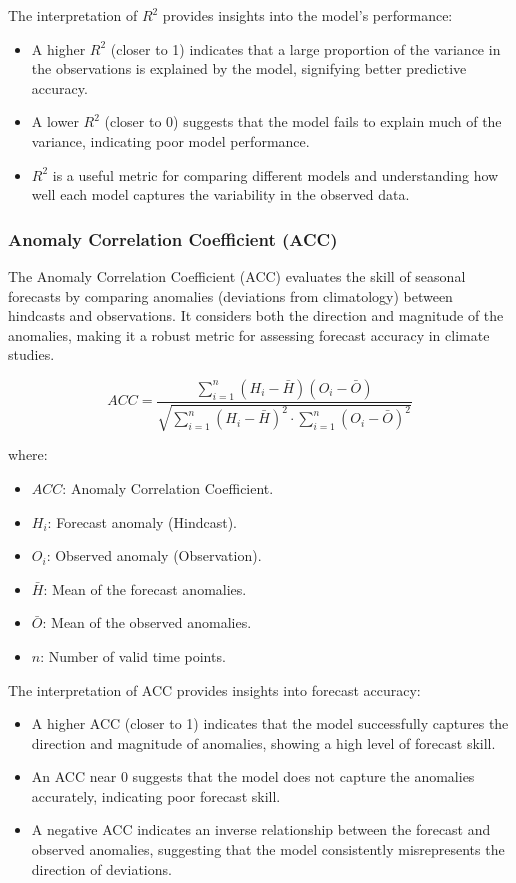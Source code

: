 The interpretation of \( R^2 \) provides insights into the model's performance:  
\begin{itemize}
    \item A higher \( R^2 \) (closer to 1) indicates that a large proportion of the variance in the observations is explained by the model, signifying better predictive accuracy.  
    \item A lower \( R^2 \) (closer to 0) suggests that the model fails to explain much of the variance, indicating poor model performance.  
    \item \( R^2 \) is a useful metric for comparing different models and understanding how well each model captures the variability in the observed data.  
\end{itemize}

\subsubsection{Anomaly Correlation Coefficient (ACC)}

The Anomaly Correlation Coefficient (ACC) evaluates the skill of seasonal forecasts by comparing anomalies (deviations from climatology) between hindcasts and observations. It considers both the direction and magnitude of the anomalies, making it a robust metric for assessing forecast accuracy in climate studies.

\[
ACC = \frac{\sum_{i=1}^{n} (H_i - \bar{H})(O_i - \bar{O})}{\sqrt{\sum_{i=1}^{n} (H_i - \bar{H})^2 \cdot \sum_{i=1}^{n} (O_i - \bar{O})^2}}
\]

where:  
\begin{itemize}
    \item \( ACC \): Anomaly Correlation Coefficient.  
    \item \( H_i \): Forecast anomaly (Hindcast).  
    \item \( O_i \): Observed anomaly (Observation).  
    \item \( \bar{H} \): Mean of the forecast anomalies.  
    \item \( \bar{O} \): Mean of the observed anomalies.  
    \item \( n \): Number of valid time points.  
\end{itemize}

The interpretation of ACC provides insights into forecast accuracy:  
\begin{itemize}
    \item A higher ACC (closer to 1) indicates that the model successfully captures the direction and magnitude of anomalies, showing a high level of forecast skill.  
    \item An ACC near 0 suggests that the model does not capture the anomalies accurately, indicating poor forecast skill.  
    \item A negative ACC indicates an inverse relationship between the forecast and observed anomalies, suggesting that the model consistently misrepresents the direction of deviations.  
\end{itemize}



